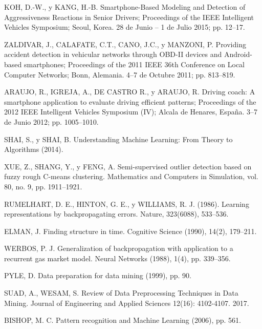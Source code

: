 \begin{thebibliography}{9}
KOH, D.-W., y KANG, H.-B. Smartphone-Based Modeling and Detection of Aggressiveness Reactions in Senior Drivers; Proceedings of the IEEE Intelligent Vehicles Symposium; Seoul, Korea. 28 de Junio – 1 de Julio 2015; pp. 12–17.

ZALDIVAR, J., CALAFATE, C.T., CANO, J.C., y MANZONI, P. Providing accident detection in vehicular networks through OBD-II devices and Android-based smartphones; Proceedings of the 2011 IEEE 36th Conference on Local Computer Networks; Bonn, Alemania. 4–7 de Octubre 2011; pp. 813–819.

ARAUJO, R., IGREJA, A., DE CASTRO R., y ARAUJO, R. Driving coach: A smartphone application to evaluate driving efficient patterns; Proceedings of the 2012 IEEE Intelligent Vehicles Symposium (IV); Alcala de Henares, Espa\~{n}a. 3–7 de Junio 2012; pp. 1005–1010.

SHAI, S., y SHAI, B. Understanding Machine Learning: From Theory to Algorithms (2014).

XUE, Z., SHANG, Y., y FENG, A. Semi-supervised outlier detection based on fuzzy rough C-means clustering. Mathematics and Computers in Simulation, vol. 80, no. 9, pp. 1911–1921.

RUMELHART, D. E., HINTON, G. E., y WILLIAMS, R. J. (1986). Learning representations by backpropagating errors. Nature, 323(6088), 533–536.

ELMAN, J. Finding structure in time. Cognitive Science (1990), 14(2), 179–211.

WERBOS, P. J. Generalization of backpropagation with application to a recurrent gas market model. Neural Networks (1988), 1(4), pp. 339–356.

PYLE, D. Data preparation for data mining (1999), pp. 90.

SUAD, A., WESAM, S. Review of Data Preprocessing Techniques in Data Mining. Journal of Engineering and Applied Sciences 12(16): 4102-4107. 2017.

BISHOP, M. C. Pattern recognition and Machine Learning (2006), pp. 561.


\end{thebibliography}
